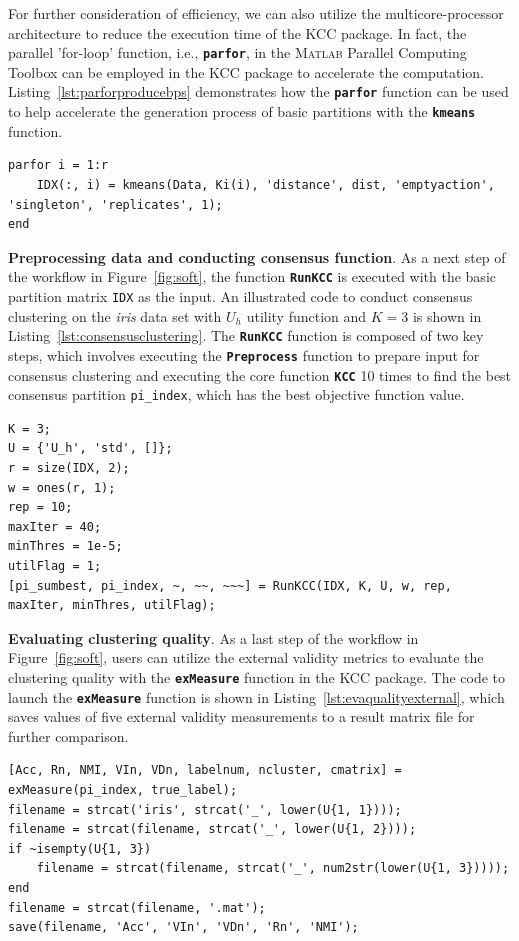 \documentclass[10pt]{acmtrans2e}
\newcommand{\Matlab}{\textsc{Matlab}}
\newcommand{\package}[1]{\textsf{#1}\xspace} %
\newcommand{\function}[1]{\textbf{\texttt{#1}}}
\newcommand{\parameter}[1]{\texttt{#1}}
\begin{document}
For further consideration of efficiency, we can also utilize the multicore-processor architecture to reduce the execution time of the \package{KCC} package. In fact, the parallel 'for-loop' function, i.e., \function{parfor}, in the \Matlab{} \package{Parallel Computing Toolbox} can be employed in the \package{KCC} package to accelerate the computation. Listing~\ref{lst:parforproducebps} demonstrates how the \function{parfor} function can be used to help accelerate the generation process of basic partitions with the \function{kmeans} function.
\begin{lstlisting}[caption={Using \function{parfor} to accelerate the process of generating BPs.},label=lst:parforproducebps]
parfor i = 1:r
    IDX(:, i) = kmeans(Data, Ki(i), 'distance', dist, 'emptyaction', 'singleton', 'replicates', 1);
end
\end{lstlisting}

\textbf{Preprocessing data and conducting consensus function}. As a next step of the workflow in Figure~\ref{fig:soft}, the function \function{RunKCC} is executed with the basic partition matrix \parameter{IDX} as the input. An illustrated code to conduct consensus clustering on the \textit{iris} data set with $U_h$ utility function and $K=3$ is shown in Listing~\ref{lst:consensusclustering}. The \function{RunKCC} function is composed of two key steps, which involves executing the \function{Preprocess} function to prepare input for consensus clustering and executing the core function \function{KCC} 10 times to find the best consensus partition \parameter{pi\_index}, which has the best objective function value.
\begin{lstlisting}[caption={Using \function{RunKCC} to conduct consensus clustering.},label=lst:consensusclustering]
K = 3;
U = {'U_h', 'std', []};
r = size(IDX, 2);
w = ones(r, 1);
rep = 10;
maxIter = 40;
minThres = 1e-5;
utilFlag = 1;
[pi_sumbest, pi_index, ~, ~~, ~~~] = RunKCC(IDX, K, U, w, rep, maxIter, minThres, utilFlag);
\end{lstlisting}

\textbf{Evaluating clustering quality}. As a last step of the workflow in Figure~\ref{fig:soft}, users can utilize the external validity metrics to evaluate the clustering quality with the \function{exMeasure} function in the \package{KCC} package. The code to launch the \function{exMeasure} function is shown in Listing~\ref{lst:evaqualityexternal}, which saves values of five external validity measurements to a result matrix file for further comparison.
\begin{lstlisting}[caption={Using \function{exMeasure} to evaluate the clustering quality.},label=lst:evaqualityexternal]
[Acc, Rn, NMI, VIn, VDn, labelnum, ncluster, cmatrix] = exMeasure(pi_index, true_label);
filename = strcat('iris', strcat('_', lower(U{1, 1})));
filename = strcat(filename, strcat('_', lower(U{1, 2})));
if ~isempty(U{1, 3})
    filename = strcat(filename, strcat('_', num2str(lower(U{1, 3}))));
end
filename = strcat(filename, '.mat');
save(filename, 'Acc', 'VIn', 'VDn', 'Rn', 'NMI');
\end{lstlisting}
\end{document}
